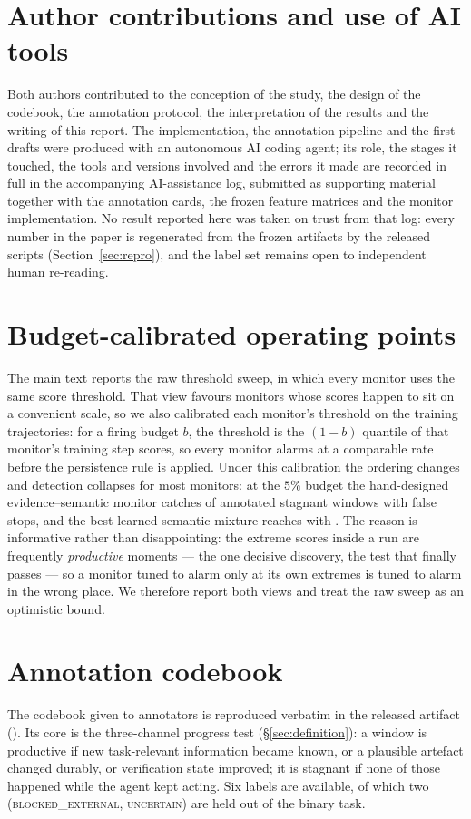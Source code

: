 \section{Author contributions and use of AI tools}

Both authors contributed to the conception of the study, the design of the codebook, the annotation
protocol, the interpretation of the results and the writing of this report. The implementation, the
annotation pipeline and the first drafts were produced with an autonomous AI coding agent; its role, the
stages it touched, the tools and versions involved and the errors it made are recorded in full in the
accompanying AI-assistance log, submitted as supporting material together with the annotation cards, the
frozen feature matrices and the monitor implementation. No result reported here was taken on trust from
that log: every number in the paper is regenerated from the frozen artifacts by the released scripts
(Section~\ref{sec:repro}), and the label set remains open to independent human re-reading.

\appendix

\section{Budget-calibrated operating points}
\label{app:calibration}
The main text reports the raw threshold sweep, in which every monitor uses the same score threshold. That
view favours monitors whose scores happen to sit on a convenient scale, so we also calibrated each
monitor's threshold on the training trajectories: for a firing budget $b$, the threshold is the $(1-b)$
quantile of that monitor's training step scores, so every monitor alarms at a comparable rate before the
persistence rule is applied. Under this calibration the ordering changes and detection collapses for most
monitors: at the $5\%$ budget the hand-designed evidence--semantic monitor catches
\pcalCThreeevidSemBFiveDet{} of annotated stagnant windows with \pcalCThreeevidSemBFiveFs{} false stops,
and the best learned semantic mixture reaches \pcalLsemBFiveDet{} with \pcalLsemBFiveFs{}. The reason is
informative rather than disappointing: the extreme scores inside a run are frequently \emph{productive}
moments --- the one decisive discovery, the test that finally passes --- so a monitor tuned to alarm only
at its own extremes is tuned to alarm in the wrong place. We therefore report both views and treat the raw
sweep as an optimistic bound.

\section{Annotation codebook}
\label{app:codebook}
The codebook given to annotators is reproduced verbatim in the released artifact
(\-). Its core is the three-channel progress test
(\S\ref{sec:definition}): a window is productive if new task-relevant information became known, or a
plausible artefact changed durably, or verification state improved; it is stagnant if none of those
happened while the agent kept acting. Six labels are available, of which two
(\textsc{blocked\_external}, \textsc{uncertain}) are held out of the binary task.

